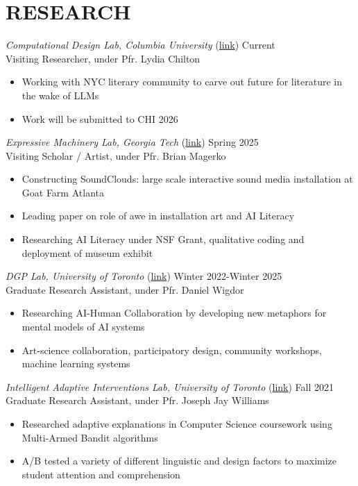 \section{RESEARCH}

{\sl Computational Design Lab, Columbia University} (\href{https://www.cs.columbia.edu/~chilton/chilton.html}{link})\hfill
Current \\
Visiting Researcher, under Pfr. Lydia Chilton  \\
\begin{itemize}
\item Working with NYC literary community to carve out future for literature in the wake of LLMs
\item Work will be submitted to CHI 2026
\end{itemize}

{\sl Expressive Machinery Lab, Georgia Tech} (\href{https://expressivemachinery.gatech.edu/}{link})\hfill
Spring 2025 \\
Visiting Scholar / Artist, under Pfr. Brian Magerko  \\
\begin{itemize}
\item Constructing SoundClouds: large scale interactive sound media installation at
Goat Farm Atlanta
\item Leading paper on role of awe in installation art and AI Literacy
\item Researching AI Literacy under NSF Grant, qualitative coding and deployment
of museum exhibit
\end{itemize}

{\sl DGP Lab, University of Toronto} (\href{https://www.dgp.toronto.edu/~dwigdor/}{link})\hfill
Winter 2022-Winter 2025 \\
Graduate Research Assistant, under Pfr. Daniel Wigdor \\
\begin{itemize}
\item Researching AI-Human Collaboration by developing new metaphors for mental models of AI systems
\item  Art-science collaboration, participatory design, community workshops, machine learning systems
\end{itemize}

{\sl Intelligent Adaptive Interventions Lab, University of Toronto} (\href{http://www.josephjaywilliams.com/}{link})\hfill
Fall 2021 \\
Graduate Research Assistant, under Pfr. Joseph Jay Williams \\
\begin{itemize}
\item Researched adaptive explanations in Computer Science coursework using Multi-Armed Bandit algorithms
\item A/B tested a variety of different linguistic and design factors to maximize student attention and comprehension
\end{itemize}

